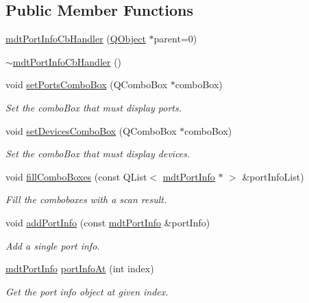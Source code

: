 \subsection*{Public Member Functions}
\begin{DoxyCompactItemize}
\item 
\hyperlink{classmdt_port_info_cb_handler_a1495b2c7f83722aaef8b244604284b51}{mdt\-Port\-Info\-Cb\-Handler} (\hyperlink{class_q_object}{Q\-Object} $\ast$parent=0)
\item 
\hyperlink{classmdt_port_info_cb_handler_aea23badb55366480f7a7d1ffeff2b85a}{$\sim$mdt\-Port\-Info\-Cb\-Handler} ()
\item 
void \hyperlink{classmdt_port_info_cb_handler_a06f9b5e8127e61026911691827f3203a}{set\-Ports\-Combo\-Box} (Q\-Combo\-Box $\ast$combo\-Box)
\begin{DoxyCompactList}\small\item\em Set the combo\-Box that must display ports. \end{DoxyCompactList}\item 
void \hyperlink{classmdt_port_info_cb_handler_a59fc2180a69119e17cfa24cf84a9c96f}{set\-Devices\-Combo\-Box} (Q\-Combo\-Box $\ast$combo\-Box)
\begin{DoxyCompactList}\small\item\em Set the combo\-Box that must display devices. \end{DoxyCompactList}\item 
void \hyperlink{classmdt_port_info_cb_handler_a82c84a3eb52cd5d941377a64788a28ef}{fill\-Combo\-Boxes} (const Q\-List$<$ \hyperlink{classmdt_port_info}{mdt\-Port\-Info} $\ast$ $>$ \&port\-Info\-List)
\begin{DoxyCompactList}\small\item\em Fill the comboboxes with a scan result. \end{DoxyCompactList}\item 
void \hyperlink{classmdt_port_info_cb_handler_ae84e252c9783c204583639212a04aa12}{add\-Port\-Info} (const \hyperlink{classmdt_port_info}{mdt\-Port\-Info} \&port\-Info)
\begin{DoxyCompactList}\small\item\em Add a single port info. \end{DoxyCompactList}\item 
\hyperlink{classmdt_port_info}{mdt\-Port\-Info} \hyperlink{classmdt_port_info_cb_handler_a92a284d227c4f0ce42df9890a9185a97}{port\-Info\-At} (int index)
\begin{DoxyCompactList}\small\item\em Get the port info object at given index. \end{DoxyCompactList}\item 

\end{DoxyCompactItemize}
